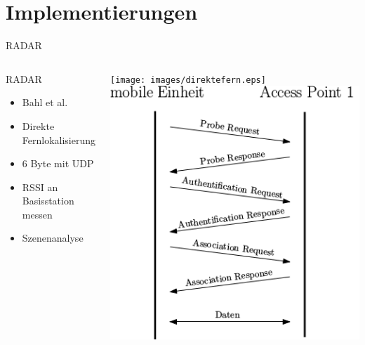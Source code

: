 \documentclass[18pt]{beamer}
\begin{document}
\section{Implementierungen}
\begin{frame}{RADAR}
	\begin{columns}
			\begin{block}{RADAR}
				\begin{itemize}
					\item Bahl et al. \cite{bahl2000radar}
					\item Direkte Fernlokalisierung
					\item 6 Byte mit UDP
					\item RSSI an Basisstation messen
					\item Szenenanalyse
				\end{itemize}
			\end{block}
			\centering
			\texttt{[image: images/direktefern.eps]}
			\includegraphics[width=\textwidth]{images/reupper.png}
	\end{columns}
\end{frame}
\end{document}
